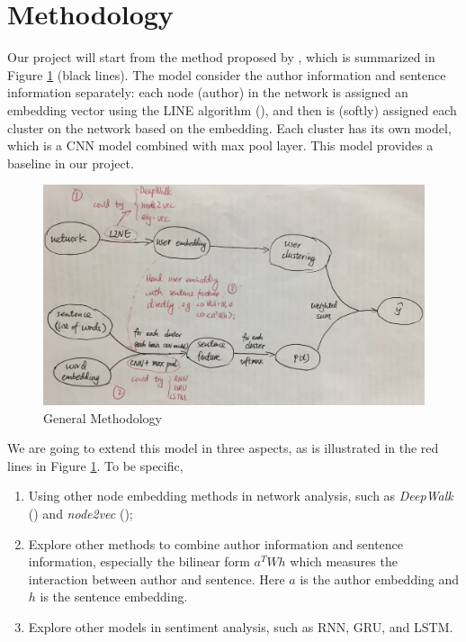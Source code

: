 
\section{Methodology}


Our project will start from the method proposed by \cite{yang2017attention}, which is summarized in Figure \ref{Fig:Flow} (black lines). The model consider the author information and sentence information separately: each node (author) in the network is assigned an embedding vector using the LINE algorithm (\cite{tang2015line}), and then is (softly) assigned each cluster on the network based on the embedding. Each cluster has its own model, which is a CNN model combined with max pool layer. This model provides a baseline in our project.

\begin{figure}[htbp] %
   \centering
   \includegraphics[width=5.2in]{flow.jpg} 
   \caption{General Methodology}
   \label{Fig:Flow}
\end{figure}



We are going to extend this model in three aspects, as is illustrated in the red lines in Figure \ref{Fig:Flow}. To be specific, 
\begin{enumerate}   [(1)]
\item Using other node embedding methods in network analysis, such as \textit{DeepWalk} (\cite{perozzi2014deepwalk}) and \textit{node2vec} (\cite{grover2016node2vec});
\item Explore other methods to combine author information and sentence information, especially the bilinear form $a^T W h$ which measures the interaction between author and sentence. Here $a$ is the author embedding and $h$ is the sentence embedding.
\item Explore other models in sentiment analysis, such as RNN, GRU, and LSTM.
\end{enumerate}
